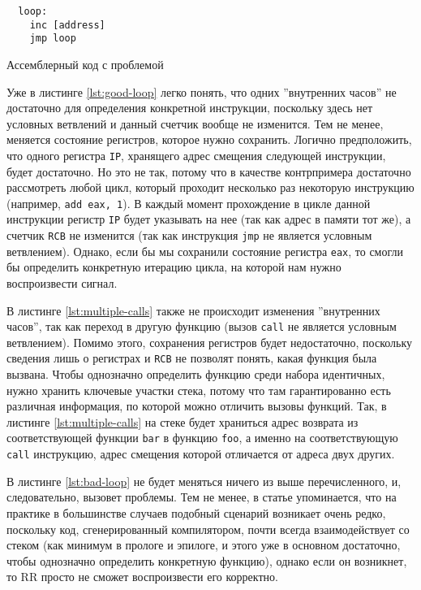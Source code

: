 \begin{codelisting}[H]
\begin{verbatim}
  loop:
    inc [address]
    jmp loop
\end{verbatim}
  \caption{Ассемблерный код с проблемой}
  \label{lst:bad-loop}
\end{codelisting}

Уже в листинге \ref{lst:good-loop} легко понять, что одних ''внутренних часов''
не достаточно для определения конкретной инструкции, поскольку здесь нет
условных ветвлений и данный счетчик вообще не изменится. Тем не менее, меняется
состояние регистров, которое нужно сохранить. Логично предположить, что одного
регистра \texttt{IP}, хранящего адрес смещения следующей инструкции, будет
достаточно. Но это не так, потому что в качестве контрпримера достаточно
рассмотреть любой цикл, который проходит несколько раз некоторую инструкцию
(например, \texttt{add eax, 1}). В каждый момент прохождение в цикле данной
инструкции регистр \texttt{IP} будет указывать на нее (так как адрес в памяти
тот же), а счетчик \texttt{RCB} не изменится (так как инструкция \texttt{jmp}
не является условным ветвлением). Однако, если бы мы сохранили состояние
регистра \texttt{eax}, то смогли бы определить конкретную итерацию цикла, на
которой нам нужно воспроизвести сигнал.

В листинге \ref{lst:multiple-calls} также не происходит изменения ''внутренних
часов'', так как переход в другую функцию (вызов \texttt{call} не является
условным ветвлением). Помимо этого, сохранения регистров будет недостаточно,
поскольку сведения лишь о регистрах и \texttt{RCB} не позволят понять, какая
функция была вызвана. Чтобы однозначно определить функцию среди набора
идентичных, нужно хранить ключевые участки стека, потому что там гарантированно
есть различная информация, по которой можно отличить вызовы функций. Так, в
листинге \ref{lst:multiple-calls} на стеке будет храниться адрес возврата из
соответствующей функции \texttt{bar} в функцию \texttt{foo}, а именно на
соответствующую \texttt{call} инструкцию, адрес смещения которой отличается от
адреса двух других.

В листинге \ref{lst:bad-loop} не будет меняться ничего из выше перечисленного,
и, следовательно, вызовет проблемы. Тем не менее, в статье \cite{rr-paper}
упоминается, что на практике в большинстве случаев подобный сценарий возникает
очень редко, поскольку код, сгенерированный компилятором, почти всегда
взаимодействует со стеком (как минимум в прологе и эпилоге, и этого уже в
основном достаточно, чтобы однозначно определить конкретную функцию), однако
если он возникнет, то RR просто не сможет воспроизвести его корректно.
